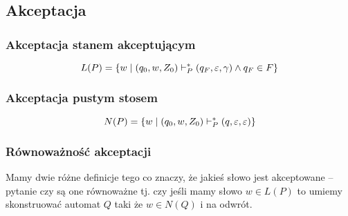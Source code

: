 \subsection{Akceptacja}
\subsubsection{Akceptacja stanem akceptującym}
\[
	L(P) = \set{ w \mid (q_0, w, Z_0) \vdash_P^* (q_F, \eps, \gamma) \land q_F \in F}
\]

\subsubsection{Akceptacja pustym stosem}
\[
	N(P) = \set{ w \mid (q_0, w, Z_0) \vdash_P^* (q, \eps, \eps)}
\]

\subsubsection{Równoważność akceptacji}
Mamy dwie różne definicje tego co znaczy, że jakieś słowo jest akceptowane -- pytanie czy są one równoważne tj. czy jeśli mamy słowo \( w \in L(P) \) to umiemy skonstruować automat \( Q \) taki że \( w \in N(Q)  \) i na odwrót.

